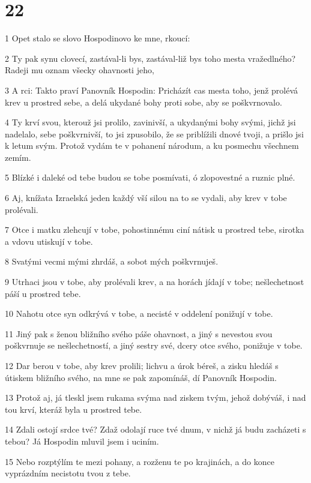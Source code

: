 \chapter{22}

\par 1 Opet stalo se slovo Hospodinovo ke mne, rkoucí:
\par 2 Ty pak synu clovecí, zastával-li bys, zastával-liž bys toho mesta vražedlného? Radeji mu oznam všecky ohavnosti jeho,
\par 3 A rci: Takto praví Panovník Hospodin: Pricházít cas mesta toho, jenž prolévá krev u prostred sebe, a delá ukydané bohy proti sobe, aby se poškvrnovalo.
\par 4 Ty krví svou, kterouž jsi prolilo, zavinivší, a ukydanými bohy svými, jichž jsi nadelalo, sebe poškvrnivší, to jsi zpusobilo, že se priblížili dnové tvoji, a prišlo jsi k letum svým. Protož vydám te v pohanení národum, a ku posmechu všechnem zemím.
\par 5 Blízké i daleké od tebe budou se tobe posmívati, ó zlopovestné a ruznic plné.
\par 6 Aj, knížata Izraelská jeden každý vší silou na to se vydali, aby krev v tobe prolévali.
\par 7 Otce i matku zlehcují v tobe, pohostinnému ciní nátisk u prostred tebe, sirotka a vdovu utiskují v tobe.
\par 8 Svatými vecmi mými zhrdáš, a sobot mých poškvrnuješ.
\par 9 Utrhaci jsou v tobe, aby prolévali krev, a na horách jídají v tobe; nešlechetnost páší u prostred tebe.
\par 10 Nahotu otce syn odkrývá v tobe, a necisté v oddelení ponižují v tobe.
\par 11 Jiný pak s ženou bližního svého páše ohavnost, a jiný s nevestou svou poškvrnuje se nešlechetností, a jiný sestry své, dcery otce svého, ponižuje v tobe.
\par 12 Dar berou v tobe, aby krev prolili; lichvu a úrok béreš, a zisku hledáš s útiskem bližního svého, na mne se pak zapomínáš, dí Panovník Hospodin.
\par 13 Protož aj, já tleskl jsem rukama svýma nad ziskem tvým, jehož dobýváš, i nad tou krví, kteráž byla u prostred tebe.
\par 14 Zdali ostojí srdce tvé? Zdaž odolají ruce tvé dnum, v nichž já budu zacházeti s tebou? Já Hospodin mluvil jsem i uciním.
\par 15 Nebo rozptýlím te mezi pohany, a rozženu te po krajinách, a do konce vyprázdním necistotu tvou z tebe.
